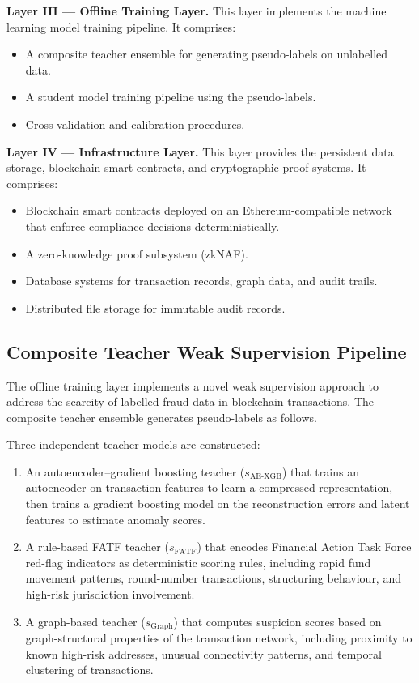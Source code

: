 \documentclass[12pt,a4paper]{article}
\begin{document}
\textbf{Layer III --- Offline Training Layer.} This layer implements the 
machine learning model training pipeline. It comprises:
\begin{itemize}
\item A composite teacher ensemble for generating pseudo-labels on 
unlabelled data.
\item A student model training pipeline using the pseudo-labels.
\item Cross-validation and calibration procedures.
\end{itemize}

\textbf{Layer IV --- Infrastructure Layer.} This layer provides the 
persistent data storage, blockchain smart contracts, and cryptographic proof 
systems. It comprises:
\begin{itemize}
\item Blockchain smart contracts deployed on an Ethereum-compatible network 
that enforce compliance decisions deterministically.
\item A zero-knowledge proof subsystem (zkNAF).
\item Database systems for transaction records, graph data, and audit trails.
\item Distributed file storage for immutable audit records.
\end{itemize}

\subsection{Composite Teacher Weak Supervision Pipeline}

The offline training layer implements a novel weak supervision approach to 
address the scarcity of labelled fraud data in blockchain transactions. The 
composite teacher ensemble generates pseudo-labels as follows.

Three independent teacher models are constructed:
\begin{enumerate}[label=(\alph*)]
\item An autoencoder--gradient boosting teacher ($s_{\text{AE-XGB}}$) that 
trains an autoencoder on transaction features to learn a compressed 
representation, then trains a gradient boosting model on the reconstruction 
errors and latent features to estimate anomaly scores.

\item A rule-based FATF teacher ($s_{\text{FATF}}$) that encodes Financial 
Action Task Force red-flag indicators as deterministic scoring rules, 
including rapid fund movement patterns, round-number transactions, 
structuring behaviour, and high-risk jurisdiction involvement.

\item A graph-based teacher ($s_{\text{Graph}}$) that computes suspicion 
scores based on graph-structural properties of the transaction network, 
including proximity to known high-risk addresses, unusual connectivity 
patterns, and temporal clustering of transactions.
\end{enumerate}
\end{document}
